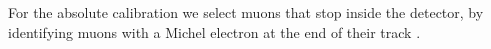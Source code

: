 

For the absolute calibration we select muons that stop inside the detector, by identifying muons with a Michel electron at the end of their track \cite{NOVA-doc-13579-FACalorimetricEnergyScale}.

